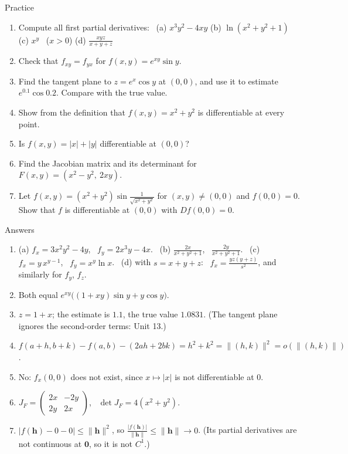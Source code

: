 \documentclass[10pt]{wosm-slides}
\newcommand{\norm}[1]{\lVert #1 \rVert}
\newcommand{\vh}{\mathbf{h}}
\begin{document}
\begin{frame}{Practice}
  \small
  \begin{enumerate}
    \item Compute all first partial derivatives: \
      (a) $x^3 y^2 - 4xy$ \quad (b) $\ln(x^2 + y^2 + 1)$ \quad
      (c) $x^y$ \ ($x > 0$) \quad (d) $\frac{xyz}{x + y + z}$
    \item Check that $f_{xy} = f_{yx}$ for $f(x, y) = e^{xy} \sin y$.
    \item Find the tangent plane to $z = e^x \cos y$ at $(0, 0)$, and use it to estimate
      $e^{0.1}\cos 0.2$. Compare with the true value.
    \item Show from the definition that $f(x, y) = x^2 + y^2$ is differentiable at every point.
    \item Is $f(x, y) = |x| + |y|$ differentiable at $(0, 0)$?
    \item Find the Jacobian matrix and its determinant for $F(x, y) = (x^2 - y^2,\ 2xy)$.
    \item Let $f(x, y) = (x^2 + y^2)\sin\frac{1}{\sqrt{x^2 + y^2}}$ for $(x, y) \ne (0, 0)$ and
      $f(0, 0) = 0$. Show that $f$ is differentiable at $(0, 0)$ with $Df(0, 0) = 0$.
  \end{enumerate}
\end{frame}

\begin{frame}{Answers}
  \small
  \begin{enumerate}
    \item (a) $f_x = 3x^2y^2 - 4y$, \ $f_y = 2x^3 y - 4x$. \
      (b) $\frac{2x}{x^2 + y^2 + 1}$, \ $\frac{2y}{x^2 + y^2 + 1}$. \
      (c) $f_x = y\, x^{y-1}$, \ $f_y = x^y \ln x$. \
      (d) with $s = x + y + z$: \ $f_x = \frac{yz(y + z)}{s^2}$, and similarly for $f_y$, $f_z$.
    \item Both equal $e^{xy}\bigl((1 + xy)\sin y + y\cos y\bigr)$.
    \item $z = 1 + x$; the estimate is $1.1$, the true value $1.0831$. (The tangent plane ignores
      the second-order terms: Unit 13.)
    \item $f(a + h, b + k) - f(a, b) - (2ah + 2bk) = h^2 + k^2 = \norm{(h, k)}^2 = o(\norm{(h, k)})$.
    \item No: $f_x(0, 0)$ does not exist, since $x \mapsto |x|$ is not differentiable at $0$.
    \item $J_F = \begin{pmatrix} 2x & -2y \\ 2y & 2x \end{pmatrix}$, \ $\det J_F = 4(x^2 + y^2)$.
    \item $|f(\vh) - 0 - 0| \le \norm{\vh}^2$, so $\frac{|f(\vh)|}{\norm{\vh}} \le \norm{\vh} \to 0$.
      (Its partial derivatives are not continuous at $\mathbf 0$, so it is not $C^1$.)
  \end{enumerate}
\end{frame}
\end{document}

